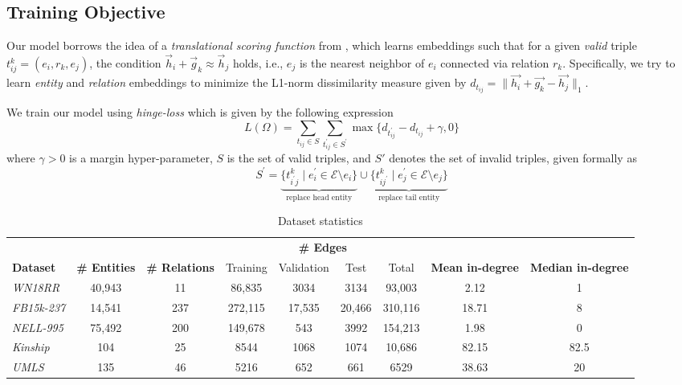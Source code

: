 \documentclass[11pt,a4paper]{article}
\begin{document}
\subsection{Training Objective}
Our model borrows the idea of a \emph{translational scoring function} from \cite{NIPS2013_5071}, which learns embeddings such that for a given \emph{valid} triple \(t_{ij}^{k} = (e_i, r_k, e_j)\), the condition  \(\vec{h}_i + \vec{g}_k \approx \vec{h}_j\) holds, i.e., \(e_j\) is the nearest neighbor of \(e_i\) connected via relation \(r_k\). 
Specifically, we try to learn \emph{entity} and \emph{relation} embeddings to minimize the L1-norm dissimilarity measure given by $d_{t_{ij}} = \lVert \vec{h_i} + \vec{g_k} - \vec{h_j} \rVert_{1}$. 

We train our model using \emph{hinge-loss} which is given by the following expression
\begin{equation}\label{eq:hingeloss}
L(\Omega) = \sum_{t_{ij} \in S} \sum_{t_{ij}^{\prime} \in S^{\prime}} \max\{d_{t_{ij}^{\prime}} - d_{t_{ij}} + \gamma,0\}
\end{equation}
where \(\gamma > 0\) is a margin hyper-parameter, $S$ is the set of valid triples, and $S'$ denotes the set of invalid triples, given formally as 
\begin{equation}\label{eq:invalid}\nonumber
  S^{\prime} = 
  \underbrace{\{t_{i^{\prime}j}^{k} \mid e_i^{\prime} \in \mathcal{E} \setminus e_i \}}_{\text{replace head entity} }
  \cup 
  \underbrace{\{t_{ij^{\prime}}^{k} \mid e_j^{\prime} \in \mathcal{E} \setminus e_j\}}_{\text{replace tail entity} }
\end{equation}
\begin{table*}[t!]
	\centering\small
	\begin{tabular}{l|cccccccc}
		\hline
		&               &              & \multicolumn{4}{c}{ \textbf{\# Edges}} \\ 
		\cline{4-7}
		\textbf{Dataset}   &  \textbf{\# Entities}  & \textbf{\# Relations}  & Training  & Validation  & Test & Total & \textbf{Mean in-degree} & \textbf{Median in-degree}\\ 
		\hline
		\emph{WN18RR}    & 40,943 & 11  & 86,835   & 3034   & 3134   & 93,003  & 2.12  & 1 \\ 
		\emph{FB15k-237} & 14,541 & 237 & 272,115  & 17,535 & 20,466 & 310,116 & 18.71 & 8  \\ 
		\emph{NELL-995}  & 75,492 & 200 & 149,678  & 543    & 3992   & 154,213 & 1.98  & 0   \\
		\emph{Kinship}   & 104    & 25  & 8544     & 1068   & 1074   & 10,686  & 82.15 & 82.5 \\
		\emph{UMLS}      & 135    & 46  & 5216     & 652    & 661    & 6529    & 38.63 & 20    \\
		\hline
	\end{tabular}
	\caption{Dataset statistics}
	\label{tb:datasets}
\end{table*}
\end{document}
